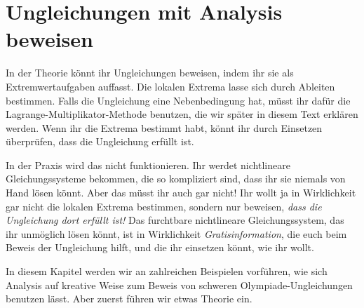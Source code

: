 \section{Ungleichungen mit Analysis beweisen}\label{kapitel:Analysis}
In der Theorie könnt ihr Ungleichungen beweisen, indem ihr sie als Extremwertaufgaben auffasst. Die lokalen Extrema lasse sich durch Ableiten bestimmen. Falls die Ungleichung eine Nebenbedingung hat, müsst ihr dafür die Lagrange-Multiplikator-Methode benutzen, die wir später in diesem Text erklären werden. Wenn ihr die Extrema bestimmt habt, könnt ihr durch Einsetzen überprüfen, dass die Ungleichung erfüllt ist.

In der Praxis wird das nicht funktionieren. Ihr werdet nichtlineare Gleichungssysteme bekommen, die so kompliziert sind, dass ihr sie niemals von Hand lösen könnt. Aber das müsst ihr auch gar nicht! Ihr wollt ja in Wirklichkeit gar nicht die lokalen Extrema bestimmen, sondern nur beweisen, \emph{dass die Ungleichung dort erfüllt ist!} Das furchtbare nichtlineare Gleichungssystem, das ihr unmöglich lösen könnt, ist in Wirklichkeit \emph{Gratisinformation}, die euch beim Beweis der Ungleichung hilft, und die ihr einsetzen könnt, wie ihr wollt.

In diesem Kapitel werden wir an zahlreichen Beispielen vorführen, wie sich Analysis auf kreative Weise zum Beweis von schweren Olympiade-Ungleichungen benutzen lässt. Aber zuerst führen wir etwas Theorie ein.%

